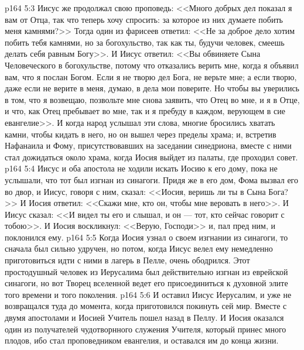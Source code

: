 \vs p164 5:3 Иисус же продолжал свою проповедь: <<Много добрых дел показал я вам от Отца, так что теперь хочу спросить: за которое из них думаете побить меня камнями?>> Тогда один из фарисеев ответил: <<Не за доброе дело хотим побить тебя камнями, но за богохульство, так как ты, будучи человек, смеешь делать себя равным Богу>>. И Иисус ответил: <<Вы обвиняете Сына Человеческого в богохульстве, потому что отказались верить мне, когда я объявил вам, что я послан Богом. Если я не творю дел Бога, не верьте мне; а если творю, даже если не верите в меня, думаю, в дела мои поверите. Но чтобы вы уверились в том, что я возвещаю, позвольте мне снова заявить, что Отец во мне, и я в Отце, и что, как Отец пребывает во мне, так и я пребуду в каждом, верующем в сие евангелие>>. И когда народ услышал эти слова, многие бросились хватать камни, чтобы кидать в него, но он вышел через пределы храма; и, встретив Нафанаила и Фому, присутствовавших на заседании синедриона, вместе с ними стал дожидаться около храма, когда Иосия выйдет из палаты, где проходил совет.
\vs p164 5:4 Иисус и оба апостола не ходили искать Иосию к его дому, пока не услышали, что тот был изгнан из синагоги. Придя же в его дом, Фома вызвал его во двор, и Иисус, говоря с ним, сказал: <<Иосия, веришь ли ты в Сына Бога?>> И Иосия ответил: <<Скажи мне, кто он, чтобы мне веровать в него>>. И Иисус сказал: <<И видел ты его и слышал, и он --- тот, кто сейчас говорит с тобою>>. И Иосия воскликнул: <<Верую, Господи>> и, пал пред ним, и поклонился ему.
\vs p164 5:5 Когда Иосия узнал о своем изгнании из синагоги, то сначала был сильно удручен, но потом, когда Иисус велел ему немедленно приготовиться идти с ними в лагерь в Пелле, очень ободрился. Этот простодушный человек из Иерусалима был действительно изгнан из еврейской синагоги, но вот Творец вселенной ведет его присоединиться к духовной элите того времени и того поколения.
\vs p164 5:6 И оставил Иисус Иерусалим, и уже не возвращался туда до момента, когда приготовился покинуть сей мир. Вместе с двумя апостолами и Иосией Учитель пошел назад в Пеллу. И Иосия оказался один из получателей чудотворнного служения Учителя, который принес много плодов, ибо стал проповедником евангелия, и оставался им до конца жизни.
